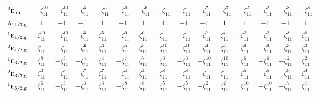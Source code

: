 \documentclass[10pt,a4paper]{article}
\makeatletter
\def\grouprule#1#2{\noalign{\marks\LTgroupmarks{\the\belowrulesep}\nobreak\vskip#1%
  \vskip\aboverulesep}\multispan\LT@cols\unskip{\leaders\hrule\@height#2\hfill\kern\z@}\cr
  \noalign{\penalty\LTrulebreak\vskip\belowrulesep\global\@lastruleclass\z@}}
\numberwithin{equation}{section}
\newcommand{\irr}[1]{\text{\normalfont\scshape #1}}
\newcommand{\conjpair}[1]{{}^{#1}}
\newcommand{\ptag}[1]{\mathrm{#1}}
\newcommand{\rootunity}[1]{\zeta_{#1}}
\makeatother
\begin{document}
{\begin{longtable}{@{}lcccccccccccccc@{}}
$\conjpair{2}\irr{e}_{5\ptag{u}}$ & $-\rootunity{11}^{10}$ & $-\rootunity{11}^{10}$ & $-\rootunity{11}^{5}$ & $-\rootunity{11}^{5}$ & $-\rootunity{11}^{6}$ & $-\rootunity{11}^{6}$ & $-\rootunity{11}$ & $-\rootunity{11}$ & $-\rootunity{11}^{7}$ & $-\rootunity{11}^{7}$ & $-\rootunity{11}^{2}$ & $-\rootunity{11}^{2}$ & $-\rootunity{11}^{8}$ & $-\rootunity{11}^{8}$\\
\grouprule{0pt}{\lightrulewidth}
$\irr{a}_{11/2,\ptag{g}}$ & $1$ & $-1$ & $-1$ & $1$ & $-1$ & $1$ & $1$ & $-1$ & $-1$ & $1$ & $1$ & $-1$ & $-1$ & $1$\\
$\conjpair{1}\irr{e}_{1/2,\ptag{g}}$ & $\rootunity{11}^{10}$ & $-\rootunity{11}^{10}$ & $-\rootunity{11}^{5}$ & $\rootunity{11}^{5}$ & $-\rootunity{11}^{6}$ & $\rootunity{11}^{6}$ & $\rootunity{11}$ & $-\rootunity{11}$ & $-\rootunity{11}^{7}$ & $\rootunity{11}^{7}$ & $\rootunity{11}^{2}$ & $-\rootunity{11}^{2}$ & $-\rootunity{11}^{8}$ & $\rootunity{11}^{8}$\\
$\conjpair{2}\irr{e}_{1/2,\ptag{g}}$ & $\rootunity{11}$ & $-\rootunity{11}$ & $-\rootunity{11}^{6}$ & $\rootunity{11}^{6}$ & $-\rootunity{11}^{5}$ & $\rootunity{11}^{5}$ & $\rootunity{11}^{10}$ & $-\rootunity{11}^{10}$ & $-\rootunity{11}^{4}$ & $\rootunity{11}^{4}$ & $\rootunity{11}^{9}$ & $-\rootunity{11}^{9}$ & $-\rootunity{11}^{3}$ & $\rootunity{11}^{3}$\\
$\conjpair{1}\irr{e}_{3/2,\ptag{g}}$ & $\rootunity{11}^{8}$ & $-\rootunity{11}^{8}$ & $-\rootunity{11}^{4}$ & $\rootunity{11}^{4}$ & $-\rootunity{11}^{7}$ & $\rootunity{11}^{7}$ & $\rootunity{11}^{3}$ & $-\rootunity{11}^{3}$ & $-\rootunity{11}^{10}$ & $\rootunity{11}^{10}$ & $\rootunity{11}^{6}$ & $-\rootunity{11}^{6}$ & $-\rootunity{11}^{2}$ & $\rootunity{11}^{2}$\\
$\conjpair{2}\irr{e}_{3/2,\ptag{g}}$ & $\rootunity{11}^{3}$ & $-\rootunity{11}^{3}$ & $-\rootunity{11}^{7}$ & $\rootunity{11}^{7}$ & $-\rootunity{11}^{4}$ & $\rootunity{11}^{4}$ & $\rootunity{11}^{8}$ & $-\rootunity{11}^{8}$ & $-\rootunity{11}$ & $\rootunity{11}$ & $\rootunity{11}^{5}$ & $-\rootunity{11}^{5}$ & $-\rootunity{11}^{9}$ & $\rootunity{11}^{9}$\\
$\conjpair{1}\irr{e}_{5/2,\ptag{g}}$ & $\rootunity{11}^{6}$ & $-\rootunity{11}^{6}$ & $-\rootunity{11}^{3}$ & $\rootunity{11}^{3}$ & $-\rootunity{11}^{8}$ & $\rootunity{11}^{8}$ & $\rootunity{11}^{5}$ & $-\rootunity{11}^{5}$ & $-\rootunity{11}^{2}$ & $\rootunity{11}^{2}$ & $\rootunity{11}^{10}$ & $-\rootunity{11}^{10}$ & $-\rootunity{11}^{7}$ & $\rootunity{11}^{7}$\\

\end{longtable}}
\end{document}
